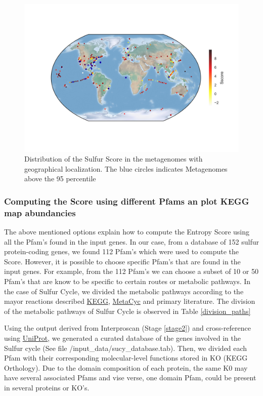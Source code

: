 \documentclass[a4paper,11pt]{report}
\begin{document}
\begin{figure}[H]
  \centering
    \includegraphics[width=160mm, scale =1]{world_map_SS.png}
    \caption{Distribution of the Sulfur Score in the metagenomes with geographical localization. The blue circles indicates Metagenomes above the 95 percentile}
        \label{fig:differential}
\end{figure}

\subsubsection{Computing the Score using different Pfams an plot KEGG map abundancies}

The above mentioned options explain how to compute the Entropy Score using all the Pfam's found in the input genes. In our case, from a database of 152 sulfur protein-coding genes, we found 112 Pfam's which were used to compute the Score. However, it is possible to choose specific Pfam's that are found in the input genes. For example, from the 112 Pfam's we can choose a subset of 10 or 50 Pfam's that are know to be specific to certain routes or metabolic pathways.
In the case of Sulfur Cycle, we divided the metabolic pathways according to the mayor reactions described \href{http://www.genome.jp/kegg/}{KEGG},  \href{https://metacyc.org/}{MetaCyc} and primary literature. The division of the metabolic pathways of Sulfur Cycle is observed in Table \ref{division_paths} 

Using the output derived from Interproscan (Stage \ref{stage2}) and cross-reference using  \href{http://www.uniprot.org/}{UniProt}, we generated a curated database of the genes involved in the Sulfur cycle (See file /input\_data/sucy\_database.tab). Then, we divided each Pfam with their corresponding molecular-level functions stored in  KO (KEGG Orthology). Due to the domain composition of each protein, the same K0 may have several associated Pfams and vise verse, one domain Pfam, could be present in several proteins or KO's.  
\end{document}
